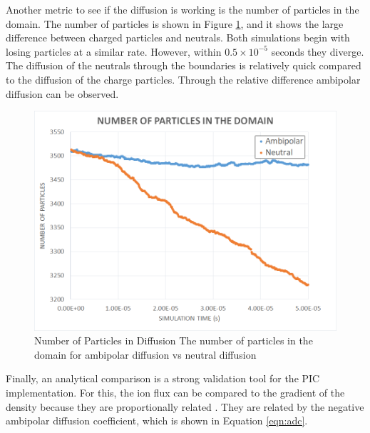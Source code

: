 \indent Another metric to see if the diffusion is working is the number of particles in the domain. The number of particles is shown in Figure \ref{fig:ambipolarexcel}, and it shows the large difference between charged particles and neutrals. Both simulations begin with losing particles at a similar rate. However, within \(0.5 \times 10^{-5}\) seconds they diverge. The diffusion of the neutrals through the boundaries is relatively quick compared to the diffusion of the charge particles. Through the relative difference ambipolar diffusion can be observed. \par

\begin{figure}
\includegraphics[width=.85\textwidth]{figures/num_particles.png}
\centering
\caption[Number of Particles in Diffusion]{Number of Particles in Diffusion \textmd{The number of particles in the domain for ambipolar diffusion vs neutral diffusion}}
\label{fig:ambipolarexcel}
\end{figure}

\indent Finally, an analytical comparison is a strong validation tool for the PIC implementation. For this, the ion flux can be compared to the gradient of the density because they are proportionally related \cite{gobel}. They are related by the negative ambipolar diffusion coefficient, which is shown in Equation \ref{eqn:adc}. \par

